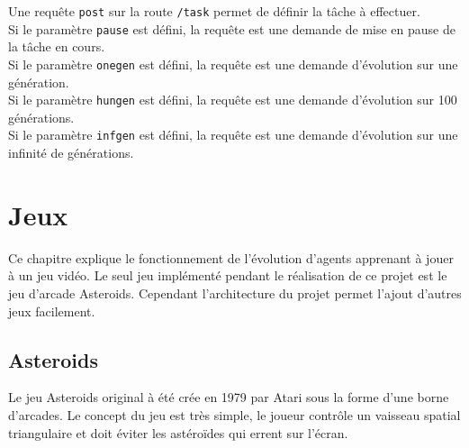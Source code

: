 \documentclass{article}
\begin{document}
Une requête \texttt{post} sur la route \texttt{/task} permet de définir la tâche à effectuer.\\

Si le paramètre \texttt{pause} est défini, la requête est une demande de mise en pause de la tâche en cours.\\

Si le paramètre \texttt{onegen} est défini, la requête est une demande d'évolution sur une génération.\\

Si le paramètre \texttt{hungen} est défini, la requête est une demande d'évolution sur 100 générations.\\

Si le paramètre \texttt{infgen} est défini, la requête est une demande d'évolution sur une infinité de générations.\\

\newpage
\section{Jeux}

Ce chapitre explique le fonctionnement de l'évolution d'agents apprenant à jouer à un jeu vidéo. Le seul jeu implémenté pendant le réalisation de ce projet est le jeu d'arcade Asteroids. Cependant l'architecture du projet permet l'ajout d'autres jeux facilement.

\subsection{Asteroids}

Le jeu Asteroids original à été crée en 1979 par Atari sous la forme d'une borne d'arcades. Le concept du jeu est très simple, le joueur contrôle un vaisseau spatial triangulaire et doit éviter les astéroïdes qui errent sur l'écran.\\
\end{document}
